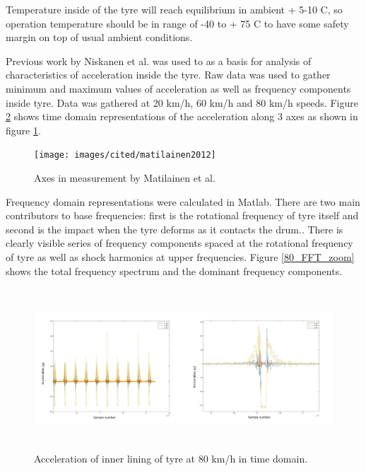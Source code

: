 Temperature inside of the tyre will reach equilibrium in ambient + 5-10 \degree C, so operation temperature should be in range of -40 to + 75 \degree C to have some safety margin on top of usual ambient conditions. 

Previous work by Niskanen et al. \cite{Niskanen2014} was used to as a basis for analysis of characteristics of acceleration inside the tyre. Raw data was used to gather minimum and maximum values of acceleration as well as frequency components inside tyre. Data was gathered at 20 km/h, 60 km/h and 80 km/h speeds. Figure \ref{80_TD} shows time domain representations of the acceleration along 3 axes as shown in figure \ref{tyre_axes}.

\begin{figure}[htb]
\begin{center}
\texttt{[image: images/cited/matilainen2012]}
\end{center}
\caption{Axes in measurement by Matilainen et al. \cite{Matilainen2012}}
\label{tyre_axes}
\end{figure}

Frequency domain representations were calculated in Matlab. There are two main contributors to base frequencies: first is the rotational frequency of tyre itself and second is the impact when the tyre deforms as it contacts the drum.. There is clearly visible series of frequency components spaced at the rotational frequency of tyre as well as shock harmonics at upper frequencies. Figure \ref{80_FFT_zoom} shows the total frequency spectrum and the dominant frequency components.

\begin{figure}[htb]
\begin{center}
\includegraphics[height=6cm]{images/matlab_figures/80kmh_timedomain_combined}
\end{center}
\caption{Acceleration of inner lining of tyre at 80 km/h in time domain.}
\label{80_TD}
\end{figure}

